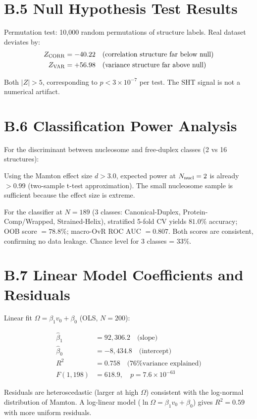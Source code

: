 \section{B.5 Null Hypothesis Test Results}

Permutation test: 10,000 random permutations of structure labels. Real dataset deviates by:
\begin{align}
    Z_{\rm CORR} &= -40.22 \quad \text{(correlation structure far below null)} \\
    Z_{\rm VAR} &= +56.98 \quad \text{(variance structure far above null)}
\end{align}

Both $|Z| > 5$, corresponding to $p < 3 \times 10^{-7}$ per test. The SHT signal is not a numerical artifact.

\section{B.6 Classification Power Analysis}

For the discriminant between nucleosome and free-duplex classes (2 vs 16 structures):

Using the Mamton effect size $d > 3.0$, expected power at $N_{\rm nucl} = 2$ is already $> 0.99$ (two-sample t-test approximation). The small nucleosome sample is sufficient because the effect size is extreme.

For the classifier at $N = 189$ (3 classes: Canonical-Duplex, Protein-Comp/Wrapped, Strained-Helix), stratified 5-fold CV yields $81.0\%$ accuracy; OOB score $= 78.8\%$; macro-OvR ROC AUC $= 0.807$. Both scores are consistent, confirming no data leakage. Chance level for 3 classes = 33\%.

\section{B.7 Linear Model Coefficients and Residuals}

Linear fit $\Omega = \beta_1 v_0 + \beta_0$ (OLS, $N = 200$):

\begin{align}
    \hat{\beta}_1 &= 92{,}306.2 \quad \text{(slope)} \\
    \hat{\beta}_0 &= -8{,}434.8 \quad \text{(intercept)} \\
    R^2 &= 0.758 \quad \text{(76\% variance explained)} \\
    F(1,198) &= 618.9, \quad p = 7.6 \times 10^{-63}
\end{align}

Residuals are heteroscedastic (larger at high $\Omega$) consistent with the log-normal distribution of Mamton. A log-linear model ($\ln\Omega = \beta_1 v_0 + \beta_0$) gives $R^2 = 0.59$ with more uniform residuals.

